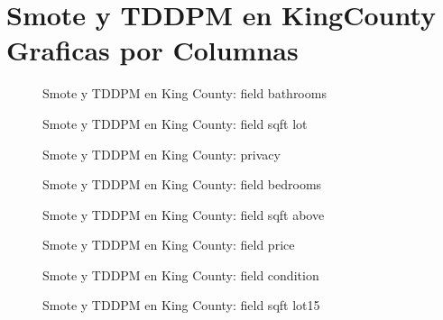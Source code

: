 \section{Smote y TDDPM en KingCounty Graficas por Columnas}
\label{A-kingcounty-top2}
\begin{figure}[H]
    \centering
    
    \caption{Smote y TDDPM en King County: field bathrooms}
    \label{pair-field_bathrooms}
\end{figure}
\begin{figure}[H]
    \centering
    
    \caption{Smote y TDDPM en King County: field sqft lot}
    \label{pair-field_sqft_lot}
\end{figure}
\begin{figure}[H]
    \centering
    
    \caption{Smote y TDDPM en King County: privacy}
    \label{pair-privacy}
\end{figure}
\begin{figure}[H]
    \centering
    
    \caption{Smote y TDDPM en King County: field bedrooms}
    \label{pair-field_bedrooms}
\end{figure}
\begin{figure}[H]
    \centering
    
    \caption{Smote y TDDPM en King County: field sqft above}
    \label{pair-field_sqft_above}
\end{figure}
\begin{figure}[H]
    \centering
    
    \caption{Smote y TDDPM en King County: field price}
    \label{pair-field_price}
\end{figure}
\begin{figure}[H]
    \centering
    
    \caption{Smote y TDDPM en King County: field condition}
    \label{pair-field_condition}
\end{figure}
\begin{figure}[H]
    \centering
    
    \caption{Smote y TDDPM en King County: field sqft lot15}
    \label{pair-field_sqft_lot15}
\end{figure}

